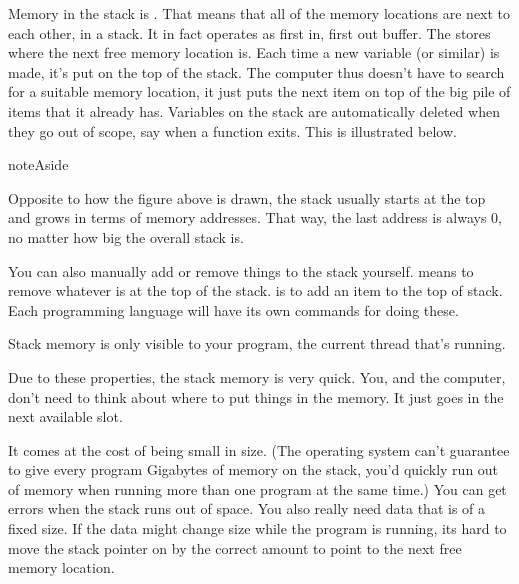 \documentclass[letterpaper,10pt,british]{sphinxmanual}
\let\sphinxpxdimen\pdfpxdimen\else\newdimen\sphinxpxdimen
\begin{document}
\sphinxAtStartPar
Memory in the stack is . That means that all of the memory locations are next to each other, in a stack. It in fact operates as first in, first out buffer. The  stores where the next free memory location is. Each time a new variable (or similar) is made, it’s put on the top of the stack. The computer thus doesn’t have to search for a suitable memory location, it just puts the next item on top of the big pile of items that it already has. Variables on the stack are automatically deleted when they go out of scope, say when a function exits. This is illustrated below.

\begin{figure}[htbp]
\centering

\noindent\sphinxincludegraphics[width=800\sphinxpxdimen]{{stack}.png}
\end{figure}

\begin{sphinxadmonition}{note}{Aside}

\sphinxAtStartPar
Opposite to how the figure above is drawn, the stack usually starts at the top and grows  in terms of memory addresses. That way, the last address is always 0, no matter how big the overall stack is.
\end{sphinxadmonition}

\sphinxAtStartPar
You can also manually add or remove things to the stack yourself.  means to remove whatever is at the top of the stack.  is to add an item to the top of stack. Each programming language will have its own commands for doing these.

\sphinxAtStartPar
Stack memory is only visible to your program, the current thread that’s running.

\sphinxAtStartPar
Due to these properties, the stack memory is very quick. You, and the computer, don’t need to think about where to put things in the memory. It just goes in the next available slot.

\sphinxAtStartPar
It comes at the cost of being small in size. (The operating system can’t guarantee to give every program Gigabytes of memory on the stack, you’d quickly run out of memory when running more than one program at the same time.) You can get  errors when the stack runs out of space. You also really need data that is of a fixed size. If the data might change size while the program is running, its hard to move the stack pointer on by the correct amount to point to the next free memory location.
\end{document}
